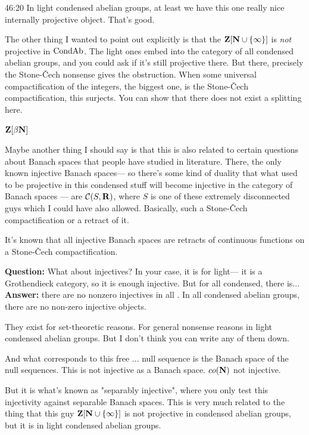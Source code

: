 \begin{unfinished}{46:20}
In light condensed abelian groups, at least we have this one really nice internally projective object. That's good.

The other thing I wanted to point out explicitly is that the $\mathbf Z[\mathbf N \cup \{\infty\}]$ is \emph{not} projective in $\mathrm{Cond}\mathrm{Ab}$. The light ones embed into the category of all condensed abelian groups, and you could ask if it's still projective there. But there, precisely the Stone-Čech nonsense gives the obstruction. When some universal compactification of the integers, the biggest one, is the Stone-Čech compactification, this surjects. You can show that there does not exist a splitting here.

$\mathbf Z[\beta \mathbf N] $ %


Maybe another thing I should say is that this is also related to certain questions about Banach spaces that people have studied in literature. There, the only known injective Banach spaces--- so there's some kind of duality that what used to be projective in this condensed stuff will become injective in the category of Banach spaces --- are $\mathcal{C}(S,\mathbf R)$, where $S$ is one of these extremely disconnected guys which I could have also allowed. 
Basically, such a Stone-Čech compactification or a retract of it.

It's known that all injective Banach spaces are retracts of continuous functions on a Stone-Čech compactification.

\textbf{Question:} What about injectives? In your case, it is for light--- it is a Grothendieck category, so it is enough injective. But for all condensed, there is...
\textbf{Answer:} there are no nonzero injectives in all . In all condensed abelian groups, there are no non-zero injective objects.

They exist for set-theoretic reasons. For general nonsense reasons in light condensed abelian groups. But I don't think you can write any of them down.

And what corresponds to this free ... null sequence is the Banach space of the null sequences. 
This is not injective as a Banach space. 
$ co(\mathbf N)$ not injective.

But it is what's known as "separably injective", where you only test this injectivity against separable Banach spaces. This is very much related to the thing that this guy $\mathbf Z[\mathbf N \cup \{\infty\}]$ is not projective in condensed abelian groups, but it is in light condensed abelian groups.


\end{unfinished}
